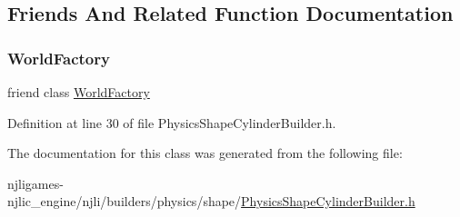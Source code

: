 \subsection{Friends And Related Function Documentation}
\mbox{\label{classnjli_1_1_physics_shape_cylinder_builder_acb96ebb09abe8f2a37a915a842babfac}} 
\subsubsection{\texorpdfstring{World\+Factory}{WorldFactory}}
{\footnotesize\ttfamily friend class \mbox{\hyperlink{classnjli_1_1_world_factory}{World\+Factory}}\hspace{0.3cm}{\ttfamily [friend]}}



Definition at line 30 of file Physics\+Shape\+Cylinder\+Builder.\+h.



The documentation for this class was generated from the following file\+:\begin{DoxyCompactItemize}
\item 
njligames-\/njlic\+\_\+engine/njli/builders/physics/shape/\mbox{\hyperlink{_physics_shape_cylinder_builder_8h}{Physics\+Shape\+Cylinder\+Builder.\+h}}\end{DoxyCompactItemize}
